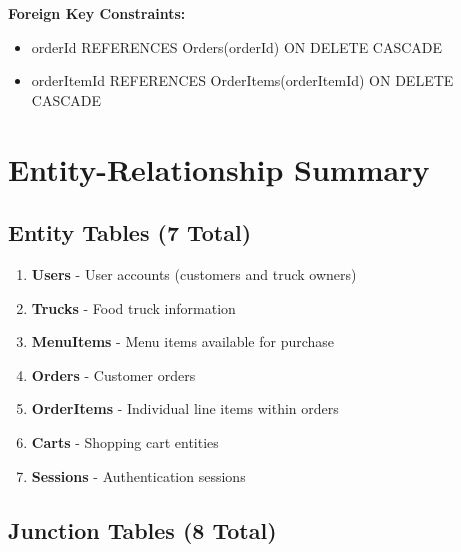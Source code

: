 \documentclass[11pt]{article}
\begin{document}
\begin{tcolorbox}[colback=lightgray, colframe=darkgray, boxrule=0.5pt, arc=2mm, left=3mm]
\textbf{Foreign Key Constraints:}
\begin{itemize}[leftmargin=1cm]
    \item orderId REFERENCES Orders(orderId) ON DELETE CASCADE
    \item orderItemId REFERENCES OrderItems(orderItemId) ON DELETE CASCADE
\end{itemize}
\end{tcolorbox}

\vspace{0.5cm}

\section{Entity-Relationship Summary}

\subsection{Entity Tables (7 Total)}

\begin{tcolorbox}[colback=lightgray, colframe=primaryblue, boxrule=1pt, arc=2mm, left=3mm]
\begin{enumerate}[leftmargin=1cm]
    \item \textbf{Users} - User accounts (customers and truck owners)
    \item \textbf{Trucks} - Food truck information
    \item \textbf{MenuItems} - Menu items available for purchase
    \item \textbf{Orders} - Customer orders
    \item \textbf{OrderItems} - Individual line items within orders
    \item \textbf{Carts} - Shopping cart entities
    \item \textbf{Sessions} - Authentication sessions
\end{enumerate}
\end{tcolorbox}

\vspace{0.5cm}

\subsection{Junction Tables (8 Total)}
\end{document}
